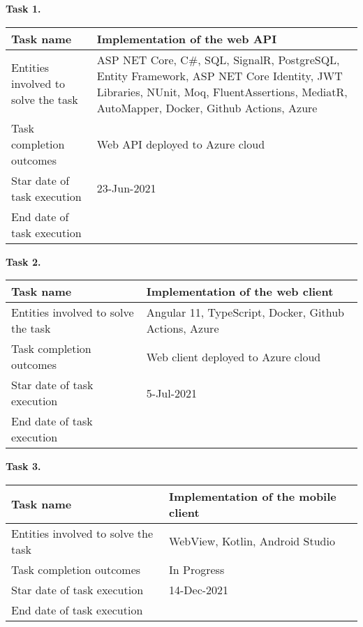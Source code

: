 \textbf{Task 1.}\\
\begin{tabular}{|p{}|p{}|}
    \hline
    Task name                   & Implementation of the web API   \\
    \hline
    Entities involved to solve the task & ASP NET Core, C\#, SQL, SignalR, PostgreSQL,
    Entity Framework, ASP NET Core Identity,
    JWT Libraries, NUnit, Moq, FluentAssertions, MediatR, AutoMapper, Docker, Github Actions, Azure \\
    \hline
    Task completion outcomes    & Web API deployed to Azure cloud \\
    \hline
    Star date of task execution & 23-Jun-2021                     \\
    \hline
    End date of task execution  &                                 \\
    \hline
\end{tabular}
\vskip 5mm
\hspace*{-6mm}\textbf{Task 2.}\\
\begin{tabular}{|p{}|p{}|}
    \hline
    Task name                           & Implementation of the web client                      \\
    \hline
    Entities involved to solve the task & Angular 11, TypeScript, Docker, Github Actions, Azure \\
    \hline
    Task completion outcomes            & Web client deployed to Azure cloud                    \\
    \hline
    Star date of task execution         & 5-Jul-2021                                            \\
    \hline
    End date of task execution          &                                                       \\
    \hline
\end{tabular}
\vskip 5mm
\hspace*{-6mm}\textbf{Task 3.}\\
\begin{tabular}{|p{}|p{}|}
    \hline
    Task name                           & Implementation of the mobile client \\
    \hline
    Entities involved to solve the task & WebView, Kotlin, Android Studio     \\
    \hline
    Task completion outcomes            & In Progress                         \\
    \hline
    Star date of task execution         & 14-Dec-2021                         \\
    \hline
    End date of task execution          &                                     \\
    \hline
\end{tabular}
